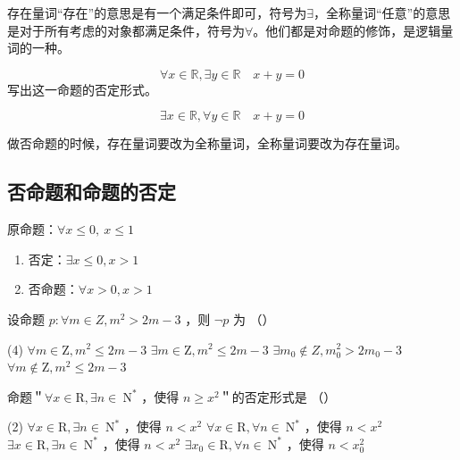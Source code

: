 \begin{definition}[存在和任意]
    存在量词“存在”的意思是有一个满足条件即可，符号为$\exists$，全称量词“任意”的意思是对于所有考虑的对象都满足条件，符号为$\forall$。他们都是对命题的修饰，是逻辑量词的一种。
\end{definition}

\begin{exercise}[逻辑量词的否定]
    $$\forall x \in \mathbb{R}, \exists y \in \mathbb{R} \quad x+y=0$$写出这一命题的否定形式。
\end{exercise}

\begin{solution}
    $$\exists x \in \mathbb{R}, \forall y \in \mathbb{R} \quad x+y=0$$

    做否命题的时候，存在量词要改为全称量词，全称量词要改为存在量词。
\end{solution}

\subsection{否命题和命题的否定}

\begin{definition}[命题的否定]
    原命题：$\forall x \leq 0, ~ x \leq 1$
    \begin{enumerate}
        \item 否定：$\exists x \leq 0, x>1$
        \item 否命题：$\forall x>0, x>1$
    \end{enumerate}
\end{definition}

\begin{example}
    设命题 $p: \forall m \in Z, m^2>2 m-3$ ，则 $\neg p$ 为 （\qquad）
    \begin{tasks}(4)
        \task $\forall m \in \mathrm{Z}, m^2 \leq 2 m-3$
        \task $\exists m \in \mathrm{Z}, m^2 \leq 2 m-3$
        \task $\exists m_0 \notin Z, m_0^2>2 m_0-3$
        \task $\forall m \notin \mathrm{Z}, m^2 \leq 2 m-3$
    \end{tasks}
\end{example}

\begin{example}
    命题＂$\forall x \in \mathrm{R}, \exists n \in \mathrm{~N}^*$ ，使得 $n \geq x^2$＂的否定形式是 （\qquad）
    \begin{tasks}(2)
        \task $\forall x \in \mathrm{R}, \exists n \in \mathrm{~N}^*$ ，使得 $n<x^2$
        \task $\forall x \in \mathrm{R}, \forall n \in \mathrm{~N}^*$ ，使得 $n<x^2$
        \task $\exists x \in \mathrm{R}, \exists n \in \mathrm{~N}^*$ ，使得 $n<x^2$
        \task $\exists x_0 \in \mathrm{R}, \forall n \in \mathrm{~N}^*$ ，使得 $n<x_0^2$
    \end{tasks}
\end{example}


